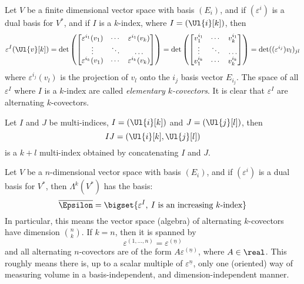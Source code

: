 \documentclass[../main-v2-manifolds.tex]{subfiles}
\begin{document}
\begin{definition}
    Let $V$ be a finite dimensional vector space with basis $(E_i)$, and if $(\varepsilon^i)$ is a dual basis for $V^*$, and if $I$ is a $k$-index, where $I = (\Ul{i}[k])$, then
    \[
        \varepsilon^I(\Ul{v}[k]) = \det\left(\begin{bmatrix}
            \varepsilon^{i_1}(v_1) & \cdots & \varepsilon^{i_1}(v_k)\\
            \vdots & \ddots & \ldots \\
            \varepsilon^{i_k}(v_1) & \cdots & \varepsilon^{i_k}(v_k)
        \end{bmatrix}\right) = \det\left(\begin{bmatrix}
            v_1^{i_1}  & \cdots & v_k^{i_1} \\
            \vdots     & \ddots & \ldots    \\
            v_1^{i_k}  & \cdots & v_k^{i_k}
        \end{bmatrix}\right) = \det((\varepsilon^{i_j})v_l)_{jl}
    \]
    where $\varepsilon^{i_j}(v_l)$ is the projection of $v_l$ onto the $i_j$ basis vector $E_{i_j}$. The space of all $\varepsilon^I$ where $I$ is a $k$-index are called \emph{elementary $k$-covectors}. It is clear that $\varepsilon^I$ are alternating $k$-covectors.
\end{definition}

\begin{definition}
    Let $I$ and $J$ be multi-indices, $I = (\Ul{i}[k])$ and $J = (\Ul{j}[l])$, then
    \[
    IJ = (\Ul{i}[k],\Ul{j}[l])
    \]
    is a $k+l$ multi-index obtained by concatenating $I$ and $J$.
\end{definition}

\begin{wts}[Proposition 14.8]\label{lee-chp14:prop-14.8}
    Let $V$ be a $n$-dimensional vector space with basis $(E_i)$, and if $(\varepsilon^i)$ is a dual basis for $V^*$, then $\Lambda^k(V^*)$ has the basis:
    \[
        \overline{\Epsilon}=\bigset{\varepsilon^I,\: I\text{ is an increasing }k\text{-index}}
    \]
    In particular, this means the vector space (algebra) of alternating $k$-covectors have dimension $\binom{n}{k}$. If $k=n$, then it is spanned by 
    \[
        \varepsilon^{(1,\ldots,n)}=\varepsilon^{(\underline{n})}
    \]
    and all alternating $n$-covectors are of the form $A\varepsilon^{(\underline{n})}$, where $A\in\real$. This roughly means there is, up to a scalar multiple of $\varepsilon^{\underline{n}}$, only one (oriented) way of measuring volume in a basis-independent, and dimension-independent manner.
\end{wts}
\end{document}
